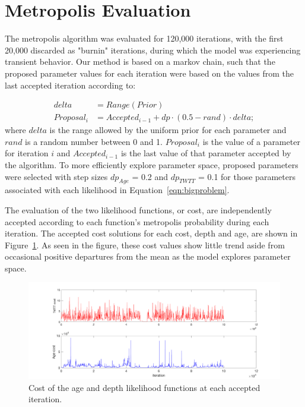 \section{Metropolis Evaluation}

The metropolis algorithm was evaluated for 120,000 iterations, with the first 20,000 discarded as "burnin" iterations, during which the model was experiencing transient behavior. Our method is based on a markov chain, such that the proposed parameter values for each iteration were based on the values from the last accepted iteration according to:

\begin{equation}\label{eqn:proposal}
\begin{split}
delta&=Range(Prior) \\
Proposal_i&=Accepted_{i-1} + dp \cdot (0.5-rand) \cdot delta;
\end{split}
\end{equation}
where $delta$ is the range allowed by the uniform prior for each parameter and $rand$ is a random number between 0 and 1. $Proposal_i$ is the value of a parameter for iteration $i$ and $Accepted_{i-1}$ is the last value of that parameter accepted by the algorithm. To more efficiently explore parameter space, proposed parameters were selected with step sizes $dp_{Age}$ = 0.2 and $dp_{TWTT}$ = 0.1 for those parameters associated with each likelihood in Equation~\ref{eqn:bigproblem}.

The evaluation of the two likelihood functions, or cost, are independently accepted according to each function's metropolis probability during each iteration. The accepted cost solutions for each cost, depth and age, are shown in Figure~\ref{fig:cost}. As seen in the figure, these cost values show little trend aside from occasional positive departures from the mean as the model explores parameter space. 

\begin{figure}[ht]
\centering
\includegraphics[scale=0.3]{../analysis/figures/cost}
\caption[]{Cost of the age and depth likelihood functions at each accepted iteration.}
\label{fig:cost}
\end{figure}





